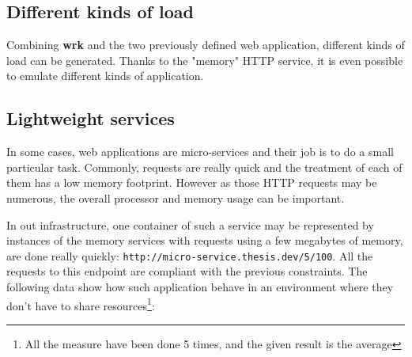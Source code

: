 \subsection{Different kinds of load}

Combining \textbf{wrk} and the two previously defined web application, different
kinds of load can be generated. Thanks to the "memory" HTTP service, it is even
possible to emulate different kinds of application.

\subsection{Lightweight services}

In some cases, web applications are micro-services and their job is to do a small
particular task. Commonly, requests are really quick and the treatment of each of
them has a low memory footprint. However as those HTTP requests may be numerous,
the overall processor and memory usage can be important.

In out infrastructure, one container of such a service may be represented by instances
of the memory services with requests using a few megabytes of memory, are done
really quickly: \texttt{http://micro-service.thesis.dev/5/100}. All the requests to this
endpoint are compliant with the previous constraints. The following data show how 
such application behave in an environment where they don't have to share resources\footnote{All the measure
have been done 5 times, and the given result is  the average}:

